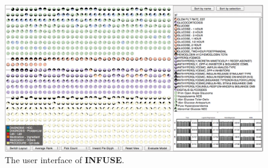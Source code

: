 \begin{figure}[ht!]
\centering
\includegraphics[width=0.8\linewidth]{figs/infuse/overview}
\caption{
The user interface of \textbf{INFUSE}.
}
\label{figs:infuse_overview}
\end{figure}